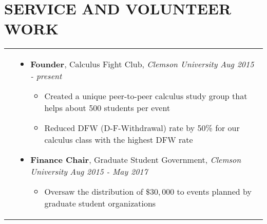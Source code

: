 \documentclass[10pt]{article}
\begin{document}
\section{\textbf{SERVICE AND VOLUNTEER WORK}}
\vspace*{-\baselineskip}
\hskip-1.7in
\begin{tabularx}{1.5\linewidth}{>{\raggedleft\scshape}p{3cm}X}
   

  &\begin{itemize}
    \setlength\itemsep{.005em}      
     \item \textbf{Founder}, Calculus Fight Club, \textit{Clemson University}    \hspace{47 mm}\textit{Aug 2015 - present}
  
     \vspace{-2mm}
             \begin{itemize}
             \setlength\itemsep{.005em}
    \item Created a unique peer-to-peer calculus study group that helps about 500 students per event
             
   \item Reduced DFW (D-F-Withdrawal) rate by 50\% for our calculus class with the highest DFW rate

   \end{itemize}  
   



    
                             \item \textbf{Finance Chair}, Graduate Student Government,  \textit{Clemson University}   \hspace{16 mm}\textit{Aug 2015 - May 2017}
  
        \vspace{-2mm}
             \begin{itemize}
             \setlength\itemsep{.005em}
   \item Oversaw the distribution of $ \$ 30,000$ to events planned by graduate student organizations

   \end{itemize}  
  

  \end{itemize} 

\end{tabularx}
\end{document}
